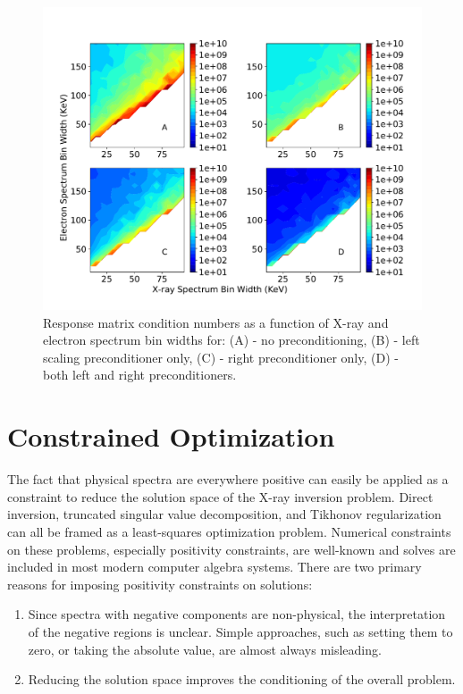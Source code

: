 \begin{figure}[p]
    \centering
    \includegraphics[width=1.1\textwidth]{figures/chapter_4/condition_number_binning_precondition/fig.pdf}
    \caption{Response matrix condition numbers as a function of X-ray and electron spectrum bin widths for: (A) - no preconditioning, (B) - left scaling preconditioner only, (C) - right preconditioner only, (D) - both left and right preconditioners. }
    \label{condition_number_binning_withprecondition}
\end{figure}

\section{Constrained Optimization}

The fact that physical spectra are everywhere positive can easily be applied as a constraint to reduce the solution space of the X-ray inversion problem. Direct inversion, truncated singular value decomposition, and Tikhonov regularization can all be framed as a least-squares optimization problem. Numerical constraints on these problems, especially positivity constraints, are well-known and solves are included in most modern computer algebra systems. There are two primary reasons for imposing positivity constraints on solutions:

\begin{enumerate}
    \item Since spectra with negative components are non-physical, the interpretation of the negative regions is unclear. Simple approaches, such as setting them to zero, or taking the absolute value, are almost always misleading. \item Reducing the solution space improves the conditioning of the overall problem.
\end{enumerate}

